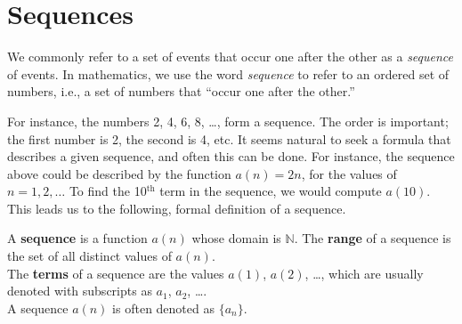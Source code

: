 

\section{Sequences}\label{sec:sequences}

We commonly refer to a set of events that occur one after the other as a \textit{sequence} of events. In mathematics, we use the word \textit{sequence} to refer to an ordered set of numbers, i.e., a set of numbers that ``occur one after the other.''

For instance, the numbers 2, 4, 6, 8, \ldots, form a sequence. The order is important; the first number is 2, the second is 4, etc. It seems natural to seek a formula that describes a given sequence, and often this can be done. For instance, the sequence above could be described by the function $a(n) = 2n$, for the values of $n = 1, 2, \ldots$ To find the 10$^\text{th}$ term in the sequence, we would compute $a(10)$. This leads us to the following, formal definition of a sequence.

{A \textbf{sequence} is a function $a(n)$ whose domain is $\mathbb{N}$. The \textbf{range} of a sequence is the set of all distinct values of $a(n)$.
\\

The \textbf{terms} of a sequence are the values $a(1)$, $a(2)$, \ldots, which are usually denoted with subscripts as $a_1$, $a_2$, \ldots.\\

A sequence $a(n)$ is often denoted as $\{a_n\}$.}



